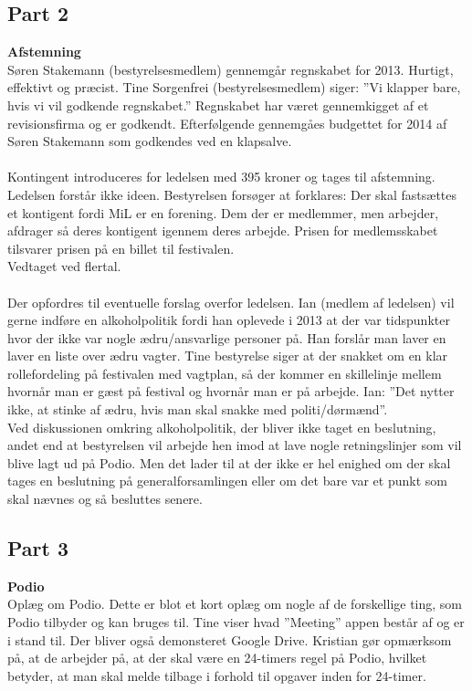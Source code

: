 \subsection{Part 2}
\noindent \textbf{Afstemning} \\
Søren Stakemann (bestyrelsesmedlem) gennemgår regnskabet for 2013. Hurtigt, effektivt og præcist. Tine Sorgenfrei (bestyrelsesmedlem) siger: ”Vi klapper bare, hvis vi vil godkende regnskabet.” Regnskabet har været gennemkigget af et revisionsfirma og er godkendt. Efterfølgende  gennemgåes budgettet for 2014 af Søren Stakemann som godkendes ved en klapsalve.
\\ \\
Kontingent introduceres for ledelsen med 395 kroner og tages til afstemning. Ledelsen forstår ikke ideen. Bestyrelsen forsøger at forklares: Der skal fastsættes et kontigent fordi MiL er en forening. Dem der er medlemmer, men arbejder, afdrager så deres kontigent igennem deres arbejde. Prisen for medlemsskabet tilsvarer prisen på en billet til festivalen. \\ Vedtaget ved flertal.
\\ \\
Der opfordres til eventuelle forslag overfor ledelsen. Ian (medlem af ledelsen) vil gerne indføre en alkoholpolitik fordi han oplevede i 2013 at der var tidspunkter hvor der ikke var nogle ædru/ansvarlige personer på. Han forslår man laver en laver en liste over ædru vagter.
Tine bestyrelse siger at der snakket om en klar rollefordeling på festivalen med vagtplan, så der kommer en skillelinje mellem hvornår man er gæst på festival og hvornår man er på arbejde.
Ian: ”Det nytter ikke, at stinke af ædru, hvis man skal snakke med politi/dørmænd”. 
\\
Ved diskussionen omkring alkoholpolitik, der bliver ikke taget en beslutning, andet end at bestyrelsen vil arbejde hen imod at lave nogle retningslinjer som vil blive lagt ud på Podio. Men det lader til at der ikke er hel enighed om der skal tages en beslutning på generalforsamlingen eller om det bare var et punkt som skal nævnes og så besluttes senere.

\subsection{Part 3}
\noindent \textbf{Podio} \\
Oplæg om Podio. Dette er blot et kort oplæg om nogle af de forskellige ting, som Podio tilbyder og kan bruges til. Tine viser hvad ”Meeting” appen består af og er i stand til. Der bliver også demonsteret Google Drive. Kristian gør opmærksom på, at de arbejder på, at der skal være en 24-timers regel på Podio, hvilket betyder, at man skal melde tilbage i forhold til opgaver inden for 24-timer.

